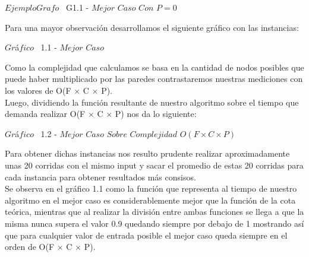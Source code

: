 \vspace*{0.3cm} \vspace*{0.3cm}
  \begin{center}
{$Ejemplo Grafo$ \ G1.1 - $Mejor$ $Caso$ $Con$ $P=0$ }
  \end{center}
  \vspace*{0.3cm}

Para una mayor observaci\'on desarrollamos el siguiente gr\'afico con las instancias:\\

\vspace*{0.3cm} \vspace*{0.3cm}
  \begin{center}
 {$Gr$\'a$fico$ \ 1.1 - $Mejor$ $Caso$}
  \end{center}
  \vspace*{0.3cm}

Como la complejidad que calculamos se basa en la cantidad de nodos posibles que puede haber multiplicado por las paredes contrastaremos nuestras mediciones con los valores de O(F $\times$ C $\times$ P).\\

Luego, dividiendo la funci\'on resultante de nuestro algoritmo sobre el tiempo que demanda realizar O(F $\times$ C $\times$ P) nos da lo siguiente:

\vspace*{0.3cm} \vspace*{0.3cm}
  \begin{center}
 {$Gr$\'a$fico$ \ 1.2 - $Mejor$ $Caso$ $Sobre$ $Complejidad$ $O(F \times C \times P)$}
  \end{center}
  \vspace*{0.3cm}

 Para obtener dichas instancias nos resulto prudente realizar aproximadamente unas 20 corridas con el mismo input y sacar el promedio de estas 20 corridas para cada instancia para obtener resultados m\'as consisos.\\ 

Se observa en el gr\'afico 1.1 como la funci\'on que representa al tiempo de nuestro algoritmo en el mejor caso es considerablemente mejor que la funci\'on de la cota te\'orica, mientras que al realizar la divisi\'on entre ambas funciones se llega a que la misma nunca supera el valor 0.9 quedando siempre por debajo de 1 mostrando as\'i que para cualquier valor de entrada posible el mejor caso queda siempre en el orden de  O(F $\times$ C $\times$ P).\\

